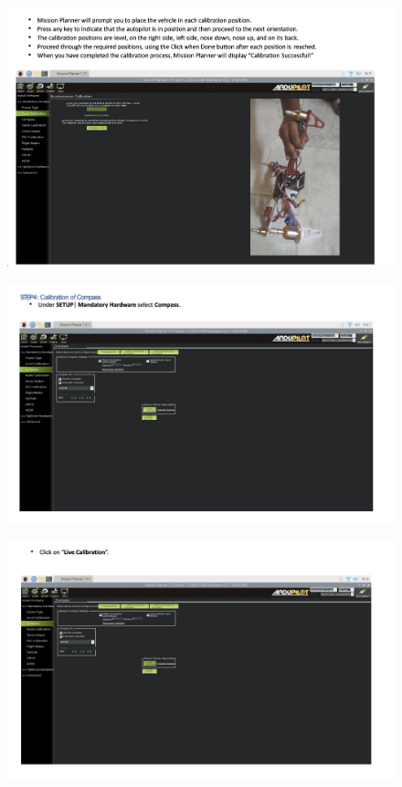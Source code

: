 \begin{figure}[h!]
\centering
\includegraphics[width=\columnwidth]{./Figures/config_img28.png}
\end{figure}

\begin{figure}[h!]
\centering
\includegraphics[width=\columnwidth]{./Figures/config_img29.png}
\end{figure}

\begin{figure}[h!]
\centering
\includegraphics[width=\columnwidth]{./Figures/config_img30.png}
\end{figure}

